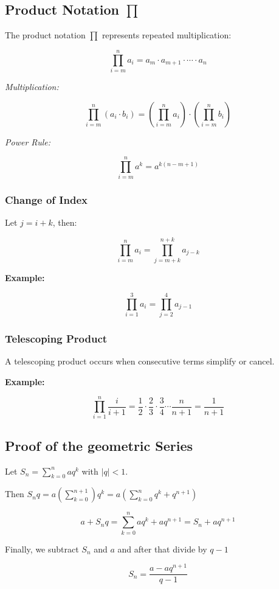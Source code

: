 \subsection{Product Notation \texorpdfstring{\(\prod\)}{∏}}

The product notation \(\prod\) represents repeated multiplication:

\[
    \prod_{i = m}^{n} a_i = a_m \cdot a_{m+1} \cdot \cdots \cdot a_n
\]

\emph{Multiplication:}
    
\[
    \prod_{i = m}^{n} (a_i \cdot b_i) = \left( \prod_{i = m}^{n} a_i \right) \cdot \left( \prod_{i = m}^{n} b_i \right)
\]

\emph{Power Rule:}
    
\[
    \prod_{i = m}^{n} a^k = a^{k(n - m + 1)}
\]

\subsubsection{Change of Index}

Let \(j = i + k\), then:

\[
    \prod_{i = m}^{n} a_i = \prod_{j = m + k}^{n + k} a_{j - k}
\]

\textbf{Example:}

\[
    \prod_{i = 1}^{3} a_i = \prod_{j = 2}^{4} a_{j - 1}
\]

\subsubsection{Telescoping Product}

A telescoping product occurs when consecutive terms simplify or cancel.
\vspace{\baselineskip}

\textbf{Example:}

\[
    \prod_{i = 1}^{n} \frac{i}{i+1} = \frac{1}{2} \cdot \frac{2}{3} \cdot \frac{3}{4} \cdots \frac{n}{n+1} = \frac{1}{n+1}
\]

\subsection{Proof of the geometric Series}

Let \(S_n = \sum_{k = 0}^{n}aq^k\) with \(|q| < 1\).
\vspace{\baselineskip}

Then \(S_n q = a(\sum_{k = 0}^{n + 1})q^k = a\left( \sum_{k= 0}^{n} q^k + q^{n + 1}\right)\)

\[
    a + S_n q = \sum_{k = 0}^{n}aq^k + aq^{n + 1}  = S_n + aq^{n + 1}
\]

Finally, we subtract \(S_n\) and \(a\) and after that divide by \(q - 1\)

\[
    S_n = \frac{a - aq^{n + 1}}{q - 1}
\]

\QED